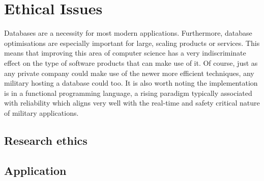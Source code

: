 \chapter{Ethical Issues}
\begin{comment}
You are required to include a short discussion of ethical, legal, societal and professional issues that are relevant to your project (usually 1 to 2 pages long). This should fit in the most appropriate section of your project report, often the Background or Conclusions section.
\end{comment}

Databases are a necessity for most modern applications. Furthermore, database optimisations are especially important for large, scaling products or services. This means that improving this area of computer science has a very indiscriminate effect on the type of software products that can make use of it. Of course, just as any private company could make use of the newer more efficient techniques, any military hosting a database could too. It is also worth noting the implementation is in a functional programming language, a rising paradigm  typically associated with reliability   which aligns very well with the real-time and safety critical nature of military applications. 

\section{Research ethics}
\section{Application}

